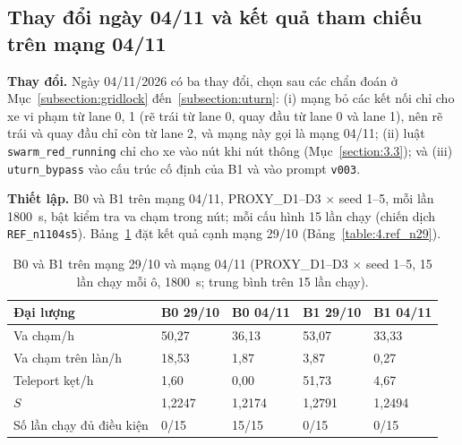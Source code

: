 \documentclass[../main.tex]{subfiles}
\begin{document}
\subsection{Thay đổi ngày 04/11 và kết quả tham chiếu trên mạng 04/11}
\label{subsection:ref_n1104}

\textbf{Thay đổi.} Ngày 04/11/2026 có ba thay đổi, chọn sau các chẩn đoán ở Mục~\ref{subsection:gridlock} đến~\ref{subsection:uturn}: (i) mạng bỏ các kết nối chỉ cho xe vi phạm từ lane 0, 1 (rẽ trái từ lane 0, quay đầu từ lane 0 và lane 1), nên rẽ trái và quay đầu chỉ còn từ lane 2, và mạng này gọi là mạng 04/11; (ii) luật \texttt{swarm\_red\_running} chỉ cho xe vào nút khi nút thông (Mục~\ref{section:3.3}); và (iii) \texttt{uturn\_bypass} vào cấu trúc cố định của B1 và vào prompt \texttt{v003}.

\textbf{Thiết lập.} B0 và B1 trên mạng 04/11, PROXY\_D1--D3 $\times$ seed 1--5, mỗi lần 1800~s, bật kiểm tra va chạm trong nút; mỗi cấu hình 15 lần chạy (chiến dịch \texttt{REF\_n1104s5}). Bảng~\ref{table:4.ref_n1104} đặt kết quả cạnh mạng 29/10 (Bảng~\ref{table:4.ref_n29}).

\begin{table}[H]
\centering
\small
\caption{B0 và B1 trên mạng 29/10 và mạng 04/11 (PROXY\_D1--D3 $\times$ seed 1--5, 15 lần chạy mỗi ô, 1800~s; trung bình trên 15 lần chạy).} \label{table:4.ref_n1104}
\begin{tabular}{|p{4.4cm}|p{2.1cm}|p{2.1cm}|p{2.1cm}|p{2.1cm}|}
\hline
\textbf{Đại lượng} & \textbf{B0 29/10} & \textbf{B0 04/11} & \textbf{B1 29/10} & \textbf{B1 04/11} \\ \hline
Va chạm/h & 50,27 & 36,13 & 53,07 & 33,33 \\ \hline
Va chạm trên làn/h & 18,53 & 1,87 & 3,87 & 0,27 \\ \hline
Teleport kẹt/h & 1,60 & 0,00 & 51,73 & 4,67 \\ \hline
$S$ & 1,2247 & 1,2174 & 1,2791 & 1,2494 \\ \hline
Số lần chạy đủ điều kiện & 0/15 & 15/15 & 0/15 & 0/15 \\ \hline
\end{tabular}
\end{table}
\end{document}
